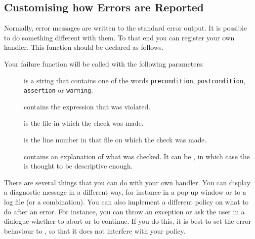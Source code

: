 \begin{ccAdvanced}

\section{Customising how Errors are Reported}

Normally, error messages are written to the standard error output.
It is possible to do something different with them.
To that end you can register your own handler.
This function should be declared as follows.

\ccTexHtml{\begin{samepage}}{}
\renewcommand{\ccLongParamLayout}{\ccTrue}

\lcTex{\ccAutoIndexingOff}
\ccTexHtml{\end{samepage}}{}
\lcTex{\ccAutoIndexingOn}

Your failure function will be called with the following parameters:
\begin{description}
 \item[] is a string that contains one of the words 
      \texttt{precondition}, \texttt{postcondition}, \texttt{assertion} or 
      \texttt{warning}. 
 \item[] contains the expression that was violated.
 \item[] is the file in which the check was made.
 \item[] is the line number in that file on which the check
      was made.
 \item[] contains an explanation of what was 
      checked. It can be , in which case the 
       is thought to be descriptive enough.
\end{description}

There are several things that you can do with your own handler.
You can display a diagnostic message in a different way, for instance in 
a pop-up window or to a log file (or a combination).
You can also implement a different policy on what to do after an error.
For instance, you can throw an exception or ask the user in a dialogue 
whether to abort or to continue.
If you do this, it is best to set the error behaviour to
, so that it does not interfere with your policy.


\end{ccAdvanced}
